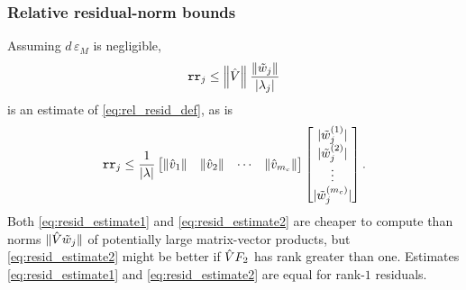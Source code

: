 \subsubsection{Relative residual-norm bounds}
Assuming $d\, \varepsilon_M$ is negligible, 
\begin{equation} 
 \texttt{rr}_j \leq \left\| \hat{V} \right\|_{}\frac{ \| \tilde{w}_j\|}{| \lambda_j|}
\label{eq:resid_estimate1}
\end{equation}
is an estimate of \eqref{eq:rel_resid_def}, as is 
\begin{equation} 
 \texttt{rr}_j \leq
\frac{1}{| \lambda|}
\begin{bmatrix} \|\hat{v}_1\|& \| \hat{v}_2 \| &\cdots& \| \hat{v}_{m_c}\| \end{bmatrix}
\begin{bmatrix} | \tilde{w}_j^{(1)}|\\ |\tilde{w}_j^{(2)}| \\ \vdots \\ | \tilde{w}_j^{(m_c)}| \end{bmatrix}.
\label{eq:resid_estimate2}
\end{equation}
Both \eqref{eq:resid_estimate1} and \eqref{eq:resid_estimate2} are cheaper to compute than norms $\| \hat{V} \tilde{w}_j \|$ of potentially large matrix-vector products, but  \eqref{eq:resid_estimate2}  might be better if $\hat{V} F_2$ has rank greater than one.  Estimates  \eqref{eq:resid_estimate1} and \eqref{eq:resid_estimate2} are equal for rank-$1$ residuals.



